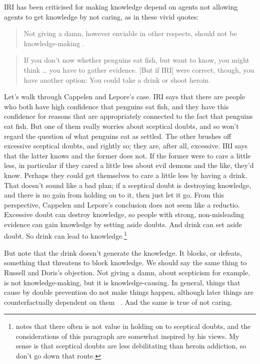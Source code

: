 IRI has been criticised for making knowledge depend on agents not allowing agents to get knowledge by not caring, as in these vivid quotes:

\begin{quote}

Not giving a damn, however enviable in other respects, should not be knowledge-making . ~\citep[433]{RussellDoris2008}
\end{quote}
\begin{quote}

If you don't now whether penguins eat fish, but want to know, you might think {\ldots} you have to gather evidence. [But if IRI] were correct, though, you have another option: You could take a drink or shoot heroin. ~\citep[1044--5]{CappelenLepore2006}
\end{quote}
Let's walk through Cappelen and Lepore's case. IRI says that there are people who both have high confidence that penguins eat fish, and they have this confidence for reasons that are appropriately connected to the fact that penguins eat fish. But one of them really worries about sceptical doubts, and so won't regard the question of what penguins eat as settled. The other brushes off excessive sceptical doubts, and rightly so; they are, after all, excessive. IRI says that the latter knows and the former does not. If the former were to care a little less, in particular if they cared a little less about evil demons and the like, they'd know. Perhaps they could get themselves to care a little less by having a drink. That doesn't sound like a bad plan; if a sceptical doubt is destroying knowledge, and there is no gain from holding on to it, then just let it go. From this perspective, Cappelen and Lepore's conclusion does not seem like a reductio. Excessive doubt can destroy knowledge, so people with strong, non-misleading evidence can gain knowledge by setting aside doubts. And drink can set aside doubt. So drink can lead to knowledge.\footnote{ \citet{Wright2004} notes that there often is not value in holding on to sceptical doubts, and the considerations of this paragraph are somewhat inspired by his views. My sense is that sceptical doubts are less debilitating than heroin addiction, so don't go down that route.}

But note that the drink doesn't generate the knowledge. It blocks, or defeats, something that threatens to block knowledge. We should say the same thing to Russell and Doris's objection. Not giving a damn, about scepticism for example, is not knowledge-making, but it is knowledge-causing. In general, things that cause by double prevention do not make things happen, although later things are counterfactually dependent on them ~\citep{Lewis2004a}. And the same is true of not caring.

